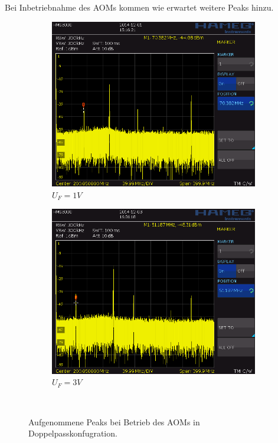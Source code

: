 \documentclass[bigchapter,colorback,accentcolor=tud4b,linedtoc,11pt]{tudreport}
\begin{document}
Bei Inbetriebnahme des AOMs kommen wie erwartet weitere Peaks hinzu.

\begin{figure}[H]
  \centering
  \begin{subfigure}[H]{0.45\textwidth}
    \includegraphics[width=\textwidth]{data/Aufgabe6/frequ_Uf_1.png}
    \caption[Cap for listoffigures]{$U_F = 1V$}
    \label{fig:UF1}
  \end{subfigure}
  \begin{subfigure}[H]{0.45\textwidth}
    \includegraphics[width=\textwidth]{data/Aufgabe6/Aufgabe6_Uf3V_AOMein.png}
    \caption[Cap for listoffigures]{$U_F = 3V$}
    \label{fig:UF3}
  \end{subfigure}~%
  \caption{Aufgenommene Peaks bei Betrieb des AOMs in Doppelpasskonfugration\cite{AndereGruppe}.}\label{fig:doublepasspeaks}
\end{figure}
\end{document}
